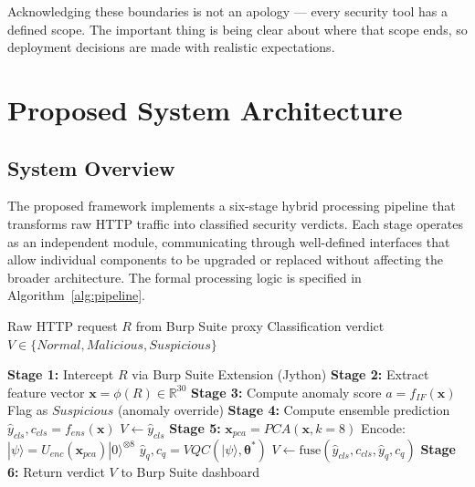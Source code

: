 \documentclass[journal,onecolumn]{IEEEtran}
\begin{document}
Acknowledging these boundaries is not an apology --- every security tool has a defined scope. The important thing is being clear about where that scope ends, so deployment decisions are made with realistic expectations.

\section{Proposed System Architecture}

\subsection{System Overview}
The proposed framework implements a six-stage hybrid processing pipeline that transforms raw HTTP traffic into classified security verdicts. Each stage operates as an independent module, communicating through well-defined interfaces that allow individual components to be upgraded or replaced without affecting the broader architecture. The formal processing logic is specified in Algorithm~\ref{alg:pipeline}.

\begin{algorithm}[h]
\caption{Hybrid Quantum-Classical Detection Pipeline}
\label{alg:pipeline}
\begin{algorithmic}[1]
\Require Raw HTTP request $R$ from Burp Suite proxy
\Ensure Classification verdict $V \in \{Normal, Malicious, Suspicious\}$

\State \textbf{Stage 1:} Intercept $R$ via Burp Suite Extension (Jython)
\State \textbf{Stage 2:} Extract feature vector $\mathbf{x} = \phi(R) \in \mathbb{R}^{30}$
\State \textbf{Stage 3:} Compute anomaly score $a = f_{IF}(\mathbf{x})$
    \State Flag as $Suspicious$ (anomaly override)
\EndIf
\State \textbf{Stage 4:} Compute ensemble prediction $\hat{y}_{cls}, c_{cls} = f_{ens}(\mathbf{x})$
    \State $V \leftarrow \hat{y}_{cls}$ 
\Else
    \State \textbf{Stage 5:} $\mathbf{x}_{pca} = PCA(\mathbf{x}, k=8)$
    \State Encode: $|\psi\rangle = U_{enc}(\mathbf{x}_{pca})|0\rangle^{\otimes 8}$
    \State $\hat{y}_{q}, c_{q} = VQC(|\psi\rangle, \boldsymbol{\theta}^*)$
    \State $V \leftarrow \text{fuse}(\hat{y}_{cls}, c_{cls}, \hat{y}_{q}, c_{q})$
\EndIf
\State \textbf{Stage 6:} Return verdict $V$ to Burp Suite dashboard
\end{algorithmic}
\end{algorithm}
\end{document}
